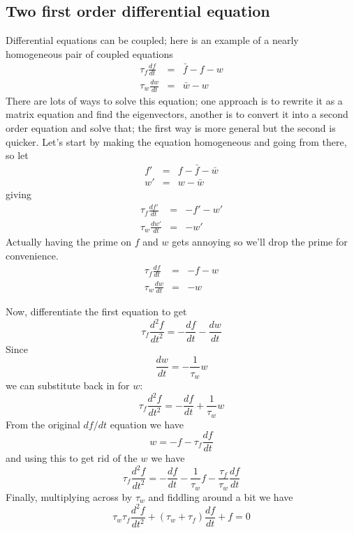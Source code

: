 \documentclass{article}
\begin{document}
\subsection*{Two first order differential equation}

Differential equations can be coupled; here is an example of a nearly homogeneous pair of coupled equations
\begin{eqnarray}
\tau_f \frac{df}{dt}&=&\bar{f}-f-w\\
\tau_w \frac{dw}{dt}&=&\bar{w}-w
\end{eqnarray}
There are lots of ways to solve this equation; one approach is to
rewrite it as a matrix equation and find the eigenvectors, another is
to convert it into a second order equation and solve that; the first
way is more general but the second is quicker. Let's start by making
the equation homogeneous and going from there, so let
\begin{eqnarray}
f'&=&f-\bar{f}-\bar{w}\\
w'&=&w-\bar{w}
\end{eqnarray}
giving
\begin{eqnarray}
\tau_f \frac{df'}{dt}&=&-f'-w'\\
\tau_w \frac{dw'}{dt}&=&-w'
\end{eqnarray}
Actually having the prime on $f$ and $w$ gets annoying so we'll drop the prime for convenience.
\begin{eqnarray}
\tau_f \frac{df}{dt}&=&-f-w\\
\tau_w \frac{dw}{dt}&=&-w
\end{eqnarray}

Now, differentiate the first equation to get
\begin{equation}
\tau_f \frac{d^2f}{dt^2}=-\frac{df}{dt}-\frac{dw}{dt}
\end{equation}
Since 
\begin{equation}
\frac{dw}{dt}=-\frac{1}{\tau_w}w
\end{equation}
we can substitute back in for $w$:
\begin{equation}
\tau_f \frac{d^2f}{dt^2}=-\frac{df}{dt}+\frac{1}{\tau_w}w
\end{equation}
From the original $df/dt$ equation we have
\begin{equation}
w=-f-\tau_f \frac{df}{dt}
\end{equation}
and using this to get rid of the $w$ we have
\begin{equation}
\tau_f \frac{d^2f}{dt^2}=-\frac{df}{dt}-\frac{1}{\tau_w}f-\frac{\tau_f}{\tau_w}\frac{df}{dt}
\end{equation}
Finally, multiplying across by $\tau_w$ and fiddling around a bit we have
\begin{equation}
\tau_w\tau_f \frac{d^2f}{dt^2}+(\tau_w+\tau_f)\frac{df}{dt}+f=0
\end{equation}
\end{document}
